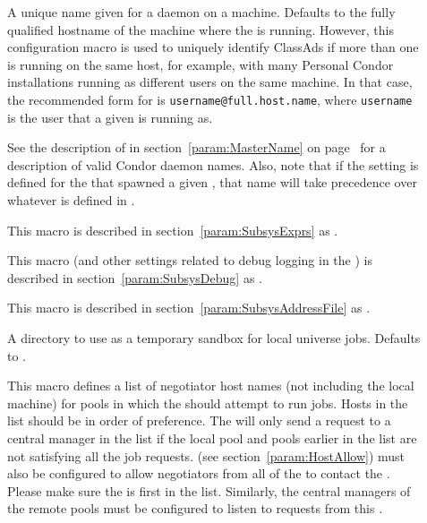 \begin{description}
\item[] \label{param:ScheddName}
  A unique name given for a  daemon on a machine.
  Defaults to the fully qualified hostname of the machine where the
   is running.
  However, this configuration macro is used to uniquely identify
   ClassAds if more than one  is running
  on the same host, for example, with many Personal Condor
  installations running as different users on the same machine.
  In that case, the recommended form for  is
  \verb$username@full.host.name$, where \verb$username$ is the
  user that a given  is running as. 

  See the description of  in
  section~\ref{param:MasterName} on page~\pageref{param:MasterName}
  for a description of valid Condor daemon names.
  Also, note that if the  setting is defined for
  the  that spawned a given , that name
  will take precedence over whatever is defined in
  . 

\item[] \label{param:ScheddAttrs} This macro is
  described in section~\ref{param:SubsysExprs} as
  .

\item[] \label{param:ScheddDebug} This macro
  (and other settings related to debug logging in the ) is
  described in section~\ref{param:SubsysDebug} as
  .

\item[] \label{param:ScheddAddressFile}
  This macro is described in
  section~\ref{param:SubsysAddressFile} as
  . 

\item[] \label{param:ScheddExecute}
  A directory to use as a temporary sandbox for local universe jobs.
  Defaults to .

\item[] \label{param:FlockNegotiatorHosts} 
  This macro defines a list of negotiator host names (not including the
  local  machine) for pools in which the
   should attempt to run jobs.  Hosts in the list should be in
  order of preference.  The  will only send a request to a
  central manager in the list if the local pool and pools earlier in
  the list are not satisfying all the job requests.
   (see
  section~\ref{param:HostAllow}) must also be configured to allow
  negotiators from all of the  to
  contact the .  Please make sure the
   is first in the
   list.  Similarly, the
  central managers of the remote pools must be configured to listen to
  requests from this .


\end{description}
